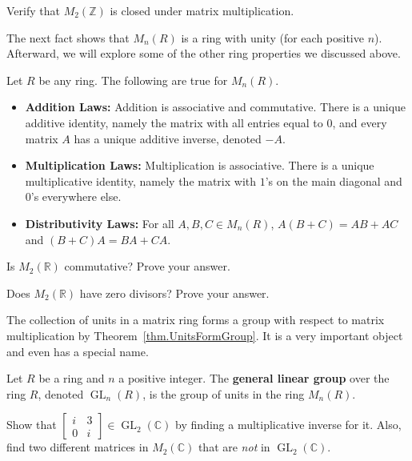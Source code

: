 \begin{problem}
Verify that $M_{2}(\mathbb{Z})$ is closed under matrix multiplication.
\end{problem}

The next fact shows that $M_{n}(R)$ is a ring with unity (for each positive $n$). Afterward, we will explore some of the other ring properties we discussed above.

\begin{fact} Let $R$ be any ring. The following are true for $M_{n}(R)$.
\begin{itemize}
\item \textbf{Addition Laws:} Addition is associative and commutative. There is a unique additive identity, namely the matrix with all entries equal to $0$, and every matrix $A$ has a unique additive inverse, denoted $-A$.
\item \textbf{Multiplication Laws:} Multiplication is associative. There is a unique multiplicative identity, namely the matrix with $1$'s on the main diagonal and $0$'s everywhere else.
\item \textbf{Distributivity Laws:} For all $A,B,C \in M_{n}(R)$, $A(B+C) = AB+AC$ and $(B+C)A = BA + CA$.
\end{itemize}
\end{fact}

\begin{problem}
Is $M_{2}(\mathbb{R})$ commutative? Prove your answer.
\end{problem}

\begin{problem}
Does $M_{2}(\mathbb{R})$ have zero divisors? Prove your answer. 
\end{problem}

The collection of units in a matrix ring forms a group with respect to matrix multiplication by Theorem~\ref{thm.UnitsFormGroup}. It is a very important object and even has a special name.

\begin{definition}
Let $R$ be a ring and $n$ a positive integer. The \textbf{general linear group} over the ring $R$,  denoted $\operatorname{GL}_n(R)$, is the group of units in the ring $M_{n}(R)$.
\end{definition}

\begin{problem}
Show that $\begin{bmatrix} i & 3\\ 0& i\end{bmatrix}\in\operatorname{GL}_{2}(\mathbb{C})$ by finding a multiplicative inverse for it. Also, find two different matrices in $M_{2}(\mathbb{C})$ that are \emph{not} in  $\operatorname{GL}_{2}(\mathbb{C})$.
\end{problem}


